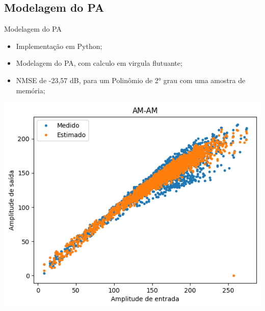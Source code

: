 \documentclass{if-beamer}
\begin{document}
\subsection{Modelagem do PA}
\begin{frame}{Modelagem do PA}
	
	
	\begin{minipage}{0.5\textwidth}
		\begin{itemize}
			\item  Implementação em Python;
			\item Modelagem do PA, com calculo em virgula flutuante;
			\item NMSE de -23,57 dB, para um Polinômio de 2° grau com uma amostra de memória;
		\end{itemize}
	\end{minipage}%
	\hspace{0.04\textwidth}
	\begin{minipage}{0.5\textwidth}
		
		\includegraphics[scale=0.4]{modeloPA.png}
		
	\end{minipage}%
\end{frame}
\end{document}
